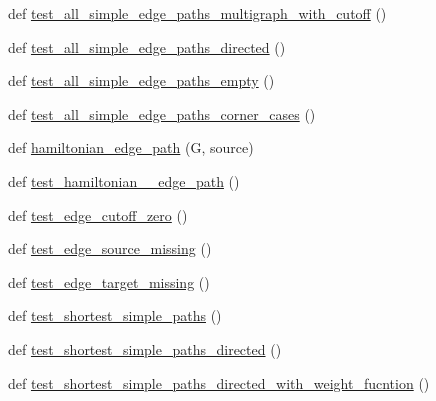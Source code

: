 \begin{DoxyCompactItemize}
def \hyperlink{namespacenetworkx_1_1algorithms_1_1tests_1_1test__simple__paths_aca257b73d557650a6c9b07458f462024}{test\+\_\+all\+\_\+simple\+\_\+edge\+\_\+paths\+\_\+multigraph\+\_\+with\+\_\+cutoff} ()
\item 
def \hyperlink{namespacenetworkx_1_1algorithms_1_1tests_1_1test__simple__paths_a86b204191e8ccb462f57cc1d68b0bb1d}{test\+\_\+all\+\_\+simple\+\_\+edge\+\_\+paths\+\_\+directed} ()
\item 
def \hyperlink{namespacenetworkx_1_1algorithms_1_1tests_1_1test__simple__paths_a3b35b4a3725e8694e37cf9a832c921d0}{test\+\_\+all\+\_\+simple\+\_\+edge\+\_\+paths\+\_\+empty} ()
\item 
def \hyperlink{namespacenetworkx_1_1algorithms_1_1tests_1_1test__simple__paths_af0dc834daa65ab98f884c2aa9171a002}{test\+\_\+all\+\_\+simple\+\_\+edge\+\_\+paths\+\_\+corner\+\_\+cases} ()
\item 
def \hyperlink{namespacenetworkx_1_1algorithms_1_1tests_1_1test__simple__paths_aabf8497a7dd9e3bea6ed94e7e8ab4cfb}{hamiltonian\+\_\+edge\+\_\+path} (G, source)
\item 
def \hyperlink{namespacenetworkx_1_1algorithms_1_1tests_1_1test__simple__paths_ad660c1748c289b329ce61bf7839cbbba}{test\+\_\+hamiltonian\+\_\+\+\_\+edge\+\_\+path} ()
\item 
def \hyperlink{namespacenetworkx_1_1algorithms_1_1tests_1_1test__simple__paths_a6a0181f99283f2b4e668211bfee3f6ea}{test\+\_\+edge\+\_\+cutoff\+\_\+zero} ()
\item 
def \hyperlink{namespacenetworkx_1_1algorithms_1_1tests_1_1test__simple__paths_ab39b9b844ad1c01d01c8e071419ecbe5}{test\+\_\+edge\+\_\+source\+\_\+missing} ()
\item 
def \hyperlink{namespacenetworkx_1_1algorithms_1_1tests_1_1test__simple__paths_a814d77ccddc2d23ec0da60fd557e4a04}{test\+\_\+edge\+\_\+target\+\_\+missing} ()
\item 
def \hyperlink{namespacenetworkx_1_1algorithms_1_1tests_1_1test__simple__paths_a3f5c971e273e5539345ecd4a1b593d42}{test\+\_\+shortest\+\_\+simple\+\_\+paths} ()
\item 
def \hyperlink{namespacenetworkx_1_1algorithms_1_1tests_1_1test__simple__paths_ab3f629aca5b7fa8aaadf48e826e23944}{test\+\_\+shortest\+\_\+simple\+\_\+paths\+\_\+directed} ()
\item 
def \hyperlink{namespacenetworkx_1_1algorithms_1_1tests_1_1test__simple__paths_a1d1f19c0c1f133ad9fa5dbc3eebb2c64}{test\+\_\+shortest\+\_\+simple\+\_\+paths\+\_\+directed\+\_\+with\+\_\+weight\+\_\+fucntion} ()

\end{DoxyCompactItemize}
